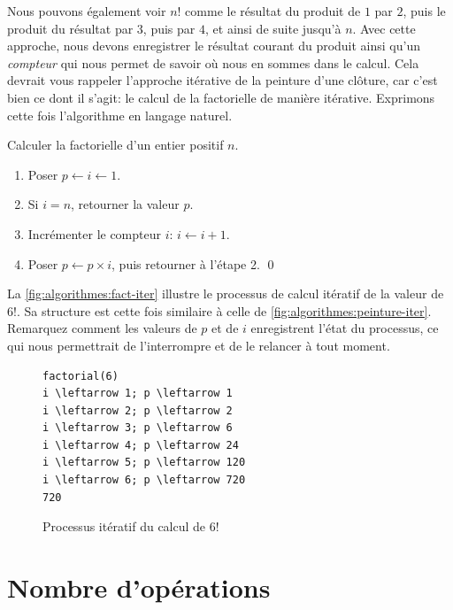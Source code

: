Nous pouvons également voir $n!$ comme le résultat du produit de $1$
par $2$, puis le produit du résultat par $3$, puis par $4$, et ainsi
de suite jusqu'à $n$. Avec cette approche, nous devons enregistrer le
résultat courant du produit ainsi qu'un
\emph{compteur} qui nous permet de savoir où nous en
sommes dans le calcul. Cela devrait vous rappeler l'approche itérative
de la peinture d'une clôture, car c'est bien ce dont il s'agit: le
calcul de la factorielle de manière itérative.
Exprimons cette fois l'algorithme en langage naturel.

\begin{algorithme}
  \label{algo:algorithmes:factorielle-iterative}
  Calculer la factorielle d'un entier positif $n$.
  \begin{enumerate}
  \item Poser $p \leftarrow i \leftarrow 1$.
  \item Si $i = n$, retourner la valeur $p$.
  \item Incrémenter le compteur $i$: $i \leftarrow i + 1$.
  \item Poser $p \leftarrow p \times i$, puis retourner à l'étape 2.
    \qed
  \end{enumerate}
\end{algorithme}

La \autoref{fig:algorithmes:fact-iter} illustre le processus de calcul
itératif de la valeur de $6!$. Sa structure est cette fois similaire à
celle de \autoref{fig:algorithmes:peinture-iter}. Remarquez comment
les valeurs de $p$ et de $i$ enregistrent l'état du processus, ce qui
nous permettrait de l'interrompre et de le relancer à tout moment.

\begin{figure}
  \centering
  \begin{minipage}{0.25\linewidth}
\begin{Verbatim}[commandchars=\\\{\}]
factorial(6)
i \leftarrow 1; p \leftarrow 1
i \leftarrow 2; p \leftarrow 2
i \leftarrow 3; p \leftarrow 6
i \leftarrow 4; p \leftarrow 24
i \leftarrow 5; p \leftarrow 120
i \leftarrow 6; p \leftarrow 720
720
\end{Verbatim}
  \end{minipage}
  \caption{Processus itératif du calcul de $6!$}
  \label{fig:algorithmes:fact-iter}
\end{figure}


\section{Nombre d'opérations}
\label{sec:algorithmes:bigO}

